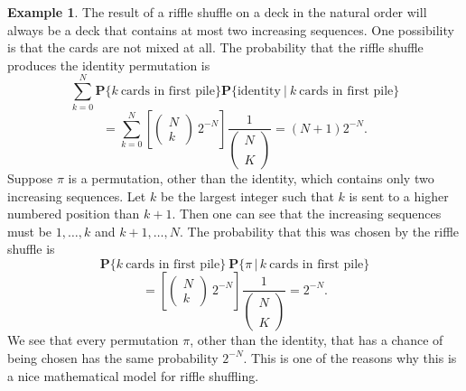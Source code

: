 \documentclass{stml-l}
\theoremstyle{definition}
\newtheorem{example}{Example}
\numberwithin{equation}{chapter}
\numberwithin{figure}{chapter}
\numberwithin{figure}{section}
\begin{document}
\begin{example}
The result of a riffle shuffle on a deck in the natural order will always be a deck that contains at most two increasing sequences. One possibility is that the cards are not mixed at all. The probability that the riffle shuffle produces the identity permutation is
\begin{equation*}
\sum_{k=0}^{N}\mathbf{P}\{k\ \mbox{cards in first pile}\}\mathbf{P}\{\mbox{identity}\ |\ k\ \mbox{cards in first pile}\}
\end{equation*}
\begin{equation*}
=\sum_{k=0}^{N}\left[\left(\begin{array}{l}
N\\
k
\end{array}\right)\ 2^{-N}\right]\frac{1}{\left(\substack{N\\\\K}\right)}=(N+1)2^{-N}.
\end{equation*}
Suppose $\pi$ is a permutation, other than the identity, which contains only two increasing sequences. Let $k$ be the largest integer such that $k$ is sent to a higher numbered position than $k+1$. Then one can
see that the increasing sequences must be $1,\ldots,k$ and $k+1,\ldots,N$. The probability that this was chosen by the riffle shuffle is
\begin{equation*}
\mathbf{P} \{k\ \mbox{cards in first pile}\}\ \mathbf{P}\{\pi\,|\,k\ \mbox{cards in first pile}\}
\end{equation*}
\begin{equation*}
=\left[\left(\begin{array}{l}
N\\
k
\end{array}\right)\ 2^{-N}\right]\frac{1}{\left(\substack{N\\\\K}\right)}=2^{-N}.
\end{equation*}
We see that every permutation $\pi$, other than the identity, that has a chance of being chosen has the same probability $2^{-N}$. This is one of the reasons why this is a nice mathematical model for riffle shuffling.


\end{example}
\end{document}
